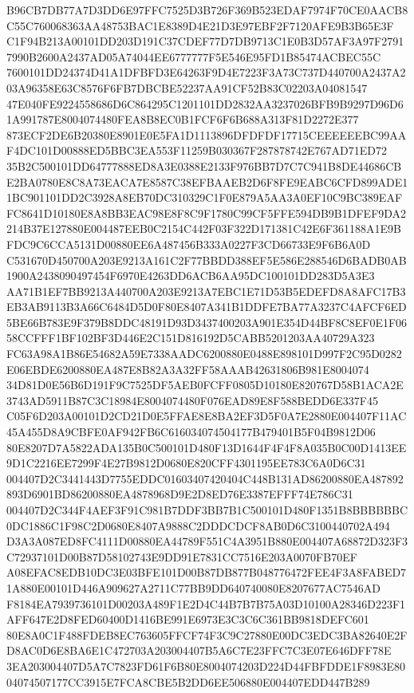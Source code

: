 \documentclass[UTF8,fontset=fandol,zihao=-4,a4paper]{ctexart}
\begin{document}
{{B96CB7DB77A7D3DD6E97FFC7525D3B726F369B523EDAF7974F70CE0AACB8C55C760068363AA48753BAC1E8389D4E21D3E97EBF2F7120AFE9B3B65E3F
C1F94B213A00101DD203D191C37CDEF77D7DB9713C1E0B3D57AF3A97F27917990B2600A2437AD05A74044EE6777777F5E546E95FD1B85474ACBEC55C
7600101DD24374D41A1DFBFD3E64263F9D4E7223F3A73C737D440700A2437A203A96358E63C8576F6FB7DBCBE52237AA91CF52B83C02203A04081547
47E040FE9224558686D6C864295C1201101DD2832AA3237026BFB9B9297D96D61A991787E8004074480FEA8B8EC0B1FCF6F6B688A313F81D2272E377
873ECF2DE6B20380E8901E0E5FA1D1113896DFDFDF17715CEEEEEEBC99AAF4DC101D00888ED5BBC3EA553F11259B030367F287878742E767AD71ED72
35B2C500101DD64777888ED8A3E0388E2133F976BB7D7C7C941B8DE44686CBE2BA0780E8C8A73EACA7E8587C38EFBAAEB2D6F8FE9EABC6CFD899ADE1
1BC901101DD2C3928A8EB70DC310329C1F0E879A5AA3A0EF10C9BC389EAFFC8641D10180E8A8BB3EAC98E8F8C9F1780C99CF5FFE594DB9B1DFEF9DA2
214B37E127880E004487EEB0C2154C442F03F322D171381C42E6F361188A1E9BFDC9C6CCA5131D00880EE6A487456B333A0227F3CD66733E9F6B6A0D
C531670D450700A203E9213A161C2F77BBDD388EF5E586E288546D6BADB0AB1900A2438090497454F6970E4263DD6ACB6AA95DC100101DD283D5A3E3
AA71B1EF7BB9213A440700A203E9213A7EBC1E71D53B5EDEFD8A8AFC17B3EB3AB9113B3A66C6484D5D0F80E8407A341B1DDFE7BA77A3237C4AFCF6ED
5BE66B783E9F379B8DDC48191D93D3437400203A901E354D44BF8C8EF0E1F0658CCFFF1BF102BF3D446E2C151D816192D5CABB5201203AA40729A323
FC63A98A1B86E54682A59E7338AADC6200880E0488E898101D997F2C95D0282E06EBDE6200880EA487E8B82A3A32FF58AAAB42631806B981E8004074
34D81D0E56B6D191F9C7525DF5AEB0FCFF0805D10180E820767D58B1ACA2E3743AD5911B87C3C18984E8004074480F076EAD89E8F588BEDD6E337F45
C05F6D203A00101D2CD21D0E5FFAE8E8BA2EF3D5F0A7E2880E004407F11AC45A455D8A9CBFE0AF942FB6C616034074504177B479401B5F04B9812D06
80E8207D7A5822ADA135B0C500101D480F13D1644F4F4F8A035B0C00D1413EE9D1C2216EE7299F4E27B9812D0680E820CFF4301195EE783C6A0D6C31
004407D2C3441443D7755EDDC01603407420404C448B131AD86200880EA487892893D6901BD86200880EA4878968D9E2D8ED76E3387EFFF74E786C31
004407D2C344F4AEF3F91C981B7DDF3BB7B1C500101D480F1351B8BBBBBBC0DC1886C1F98C2D0680E8407A9888C2DDDCDCF8AB0D6C3100440702A494
D3A3A087ED8FC4111D00880EA44789F551C4A3951B880E004407A68872D323F3C72937101D00B87D58102743E9DD91E7831CC7516E203A0070FB70EF
A08EFAC8EDB10DC3E03BFE101D00B87DB877B048776472FEE4F3A8FABED71A880E00101D446A909627A2711C77BB9DD640740080E8207677AC7546AD
F8184EA7939736101D00203A489F1E2D4C44B7B7B75A03D10100A28346D223F1AFF647E2D8FED60400D1416BE991E6973E3C3C6C361BB9818DEFC601
80E8A0C1F488FDEB8EC763605FFCF74F3C9C27880E00DC3EDC3BA82640E2FD8AC0D6E8BA6E1C472703A203004407B5A6C7E23FFC7C3E07E646DFF78E
3EA203004407D5A7C7823FD61F6B80E8004074203D224D44FBFDDE1F8983E8004074507177CC3915E7FCA8CBE5B2DD6EE506880E004407EDD447B289
}}
\end{document}
